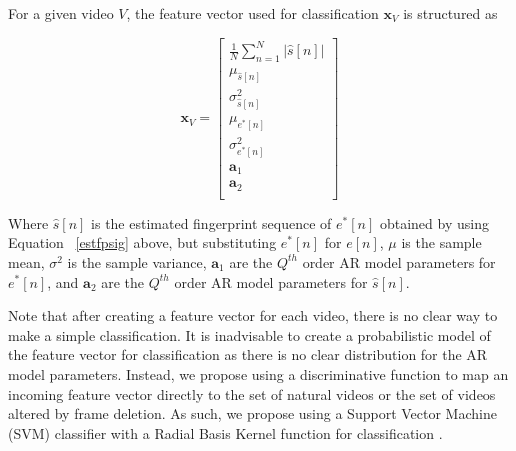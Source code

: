 For a given video $V$, the feature vector used for classification $\bm{x}_{V}$ is structured as

\begin{equation}
  \bm{x}_{V} = \begin{bmatrix}
    \frac{1}{N} \sum_{n=1}^{N} \vert \hat{s}[n] \vert \\
    \mu_{\hat{s}[n]} \\
    \sigma_{\hat{s}[n]}^{2} \\
    \mu_{e^{*}[n]} \\
    \sigma_{e^{*}[n]}^{2} \\
    \bm{a}_{1} \\
    \bm{a}_{2} \\
  \end{bmatrix}
\end{equation}

Where $\hat{s}[n]$ is the estimated fingerprint sequence of $e^{*}[n]$ obtained by using Equation ~\ref{estfpsig} above, but substituting $e^{*}[n]$ for $e[n]$, $\mu$ is the sample mean, $\sigma^{2}$ is the sample variance, $\bm{a}_{1}$ are the $Q^{th}$ order AR model parameters for $e^{*}[n]$, and $\bm{a}_{2}$ are the $Q^{th}$ order AR model parameters for $\hat{s}[n]$.

Note that after creating a feature vector for each video, there is no clear way to make a simple classification. It is inadvisable to create a probabilistic model of the feature vector for classification as there is no clear distribution for the AR model parameters. Instead, we propose using a discriminative function to map an incoming feature vector directly to the set of natural videos or the set of videos altered by frame deletion. As such, we propose using a Support Vector Machine (SVM) classifier with a Radial Basis Kernel function for classification \cite{svm}. 
